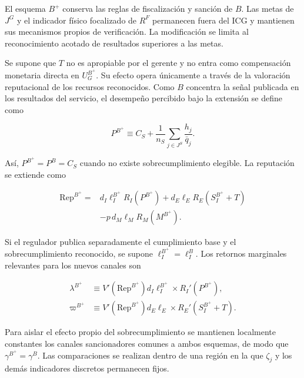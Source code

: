 El esquema \(B^{+}\) conserva las reglas de fiscalización y sanción de \(B\). Las metas de \(J^{G}\) y el indicador físico focalizado de \(R^{F}\) permanecen fuera del ICG y mantienen sus mecanismos propios de verificación. La modificación se limita al reconocimiento acotado de resultados superiores a las metas.

Se supone que \(T\) no es apropiable por el gerente y no entra como compensación monetaria directa en \(U_G^{B^{+}}\). Su efecto opera únicamente a través de la valoración reputacional de los recursos reconocidos. Como \(B\) concentra la señal publicada en los resultados del servicio, el desempeño percibido bajo la extensión se define como

\begin{equation}
\label{eq:desempeno_percibido_bplus}
P^{B^{+}}
\equiv
C_S
+
\frac{1}{n_S}
\sum_{j\in J^{S}}
\frac{h_j}{\bar q_j}.
\end{equation}

Así, \(P^{B^{+}}=P^B=C_S\) cuando no existe sobrecumplimiento elegible. La reputación se extiende como

\begin{equation}
\label{eq:reputacion_bplus}
\begin{aligned}
\mathrm{Rep}^{B^{+}}
={}&
d_I\ell_I^{B^{+}}
R_I\left(P^{B^{+}}\right)
+
d_E\ell_E
R_E\left(S_I^{B^{+}}+T\right)
\\
&-
p\,d_M\ell_M
R_M\left(M^{B^{+}}\right).
\end{aligned}
\end{equation}

Si el regulador publica separadamente el cumplimiento base y el sobrecumplimiento reconocido, se supone \(\ell_I^{B^{+}}=\ell_I^{B}\). Los retornos marginales relevantes para los nuevos canales son

\begin{subequations}
\label{eq:retornos_marginales_bplus}
\begin{align}
\lambda^{B^{+}}
&\equiv
V'\!\left(\mathrm{Rep}^{B^{+}}\right)
d_I\ell_I^{B^{+}}
\times
R_I'\!\left(P^{B^{+}}\right),
\\
\varpi^{B^{+}}
&\equiv
V'\!\left(\mathrm{Rep}^{B^{+}}\right)
d_E\ell_E
\times
R_E'\!\left(S_I^{B^{+}}+T\right).
\label{eq:varpi_bplus}
\end{align}
\end{subequations}

Para aislar el efecto propio del sobrecumplimiento se mantienen localmente constantes los canales sancionadores comunes a ambos esquemas, de modo que \(\gamma^{B^{+}}=\gamma^{B}\). Las comparaciones se realizan dentro de una región en la que \(\zeta_j\) y los demás indicadores discretos permanecen fijos.

